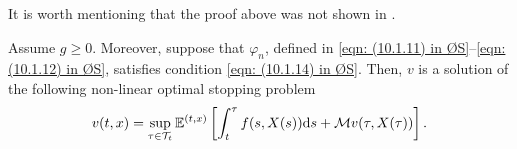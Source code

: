 \begin{remark}
    It is worth mentioning that the proof above was not shown in \cite{oksendal2007applied}.
\end{remark}

\begin{corollary}
\label{cor: Corollary 10.8 in ØS}
    Assume $g\geq 0$. Moreover, suppose that $\varphi_n$, defined in \eqref{eqn: (10.1.11) in ØS}--\eqref{eqn: (10.1.12) in ØS}, satisfies condition \eqref{eqn: (10.1.14) in ØS}. Then, $v$ is a solution of the following non-linear optimal stopping problem
    \begin{equation*}
        v(t,x) = \sup_{\tau \in \mathcal{T}_t} \mathbb{E}^{(t,x)} \left[ \int_t^\tau f(s,X(s)) \mathrm{d} s + \mathcal{M} v(\tau, X(\tau)) \right].
    \end{equation*}
\end{corollary}
